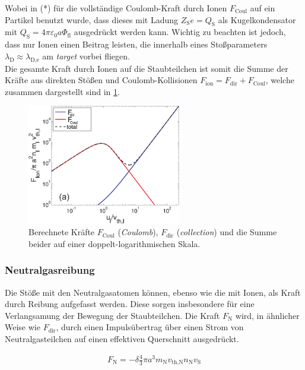 \documentclass[numbers=noenddot,a4paper]{scrartcl}
\newcommand{\ix}[1]{_\text{#1}}
\newcommand{\tilt}[1]{\textit{#1}}
\begin{document}
				Wobei in (*) für die vollständige Coulomb-Kraft durch Ionen $F\ix{Coul}$ auf ein Partikel benutzt wurde, dass dieses mit Ladung $Z\ix{S}e=Q\ix{S}$ als Kugelkondensator mit $Q\ix{S}=4\pi\varepsilon\ix{0}a\Phi\ix{fl}$ ausgedrückt werden kann. Wichtig zu beachten ist jedoch, dass nur Ionen einen Beitrag leisten, die innerhalb eines Stoßparameters $\lambda\ix{D}\approx\lambda\ix{D,e}$ am \tilt{target} vorbei fliegen.\\
				Die gesamte Kraft durch Ionen auf die Staubteilchen ist somit die Summe der Kräfte aus direkten Stößen und Coulomb-Kollisionen $F\ix{ion}=F\ix{dir}+F\ix{Coul}$, welche zusammen dargestellt sind in \ref{img:ionkräfte}.
				
					\begin{figure}
						\centering
						\includegraphics[height=0.4\textwidth,width=0.6\textwidth]{figs/forcesandtrappingmelzer.png}
						\caption{Berechnete Kräfte $F\ix{Coul}$ (\tilt{Coulomb}), $F\ix{dir}$ (\tilt{collection}) und die Summe beider auf einer doppelt-logarithmischen Skala.}\label{img:ionkräfte}
					\end{figure}
					
			\subsubsection{Neutralgasreibung}
			
				Die Stöße mit den Neutralgasatomen können, ebenso wie die mit Ionen, als Kraft durch Reibung aufgefasst werden. Diese sorgen insbesondere für eine Verlangsamung der Bewegung der Staubteilchen. Die Kraft $F\ix{N}$ wird, in ähnlicher Weise wie $F\ix{dir}$, durch einen Impulsübertrag über einen Strom von Neutralgasteilchen auf einen effektiven Querschnitt ausgedrückt.
				
					\begin{align}
						F\ix{N}=-\delta\frac{4}{3}\pi a^3m\ix{N}v\ix{th,N}n\ix{N}v\ix{S}
					\end{align}
					
\end{document}
